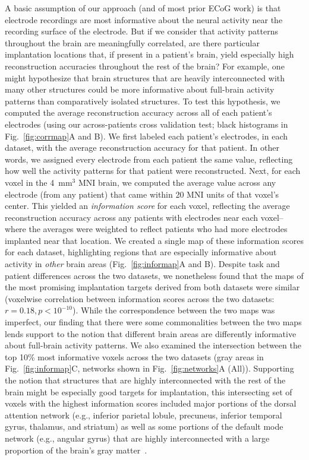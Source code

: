 \documentclass[11pt]{article}
\begin{document}
A basic assumption of our approach (and of most prior ECoG work) is that
electrode recordings are most informative about the neural activity near the
recording surface of the electrode.  But if we consider that activity patterns
throughout the brain are meaningfully correlated, are there particular
implantation locations that, if present in a patient's brain, yield especially
high reconstruction accuracies throughout the rest of the brain?  For example,
one might hypothesize that brain structures that are heavily interconnected with
many other structures could be more informative about full-brain activity
patterns than comparatively isolated structures.  To test this hypothesis, we
computed the average reconstruction accuracy across all of each patient's
electrodes (using our across-patients cross validation test; black histograms in
Fig.~\ref{fig:corrmap}A and B).  We first labeled each patient's electrodes, in
each dataset, with the average reconstruction accuracy for that patient.  In
other words, we assigned every electrode from each patient the same value,
reflecting how well the activity patterns for that patient were reconstructed.
Next, for each voxel in the 4~mm$^3$ MNI brain, we computed the average value
across any electrode (from any patient) that came within 20 MNI units of that
voxel's center.  This yielded an \textit{information score} for each voxel,
reflecting the average reconstruction accuracy across any patients with
electrodes near each voxel-- where the averages were weighted to reflect
patients who had more electrodes implanted near that location. We created a
single map of these information scores for each dataset, highlighting regions
that are especially informative about activity in \textit{other} brain areas
(Fig.~\ref{fig:informap}A and B).  Despite task and patient differences across
the two datasets, we nonetheless found that the maps of the most promising
implantation targets derived from both datasets were similar (voxelwise
correlation between information scores across the two datasets: $r = 0.18, p <
10^{-10}$).  While the correspondence between the two maps was imperfect, our
finding that there were some commonalities between the two maps lends support to
the notion that different brain areas are differently informative about
full-brain activity patterns.  We also examined the intersection between the top
10\% most informative voxels across the two datasets (gray areas in
Fig.~\ref{fig:informap}C, networks shown in Fig.~\ref{fig:networks}A (All)).
Supporting the notion that structures that are highly interconnected with the
rest of the brain might be especially good targets for implantation, this
intersecting set of voxels with the highest information scores included major
portions of the dorsal attention network (e.g., inferior parietal lobule,
precuneus, inferior temporal gyrus, thalamus, and striatum) as well as some
portions of the default mode network (e.g., angular gyrus) that are highly
interconnected with a large proportion of the brain's gray matter~\citep[e.g.,
][]{TomaVolk11}.
\end{document}
